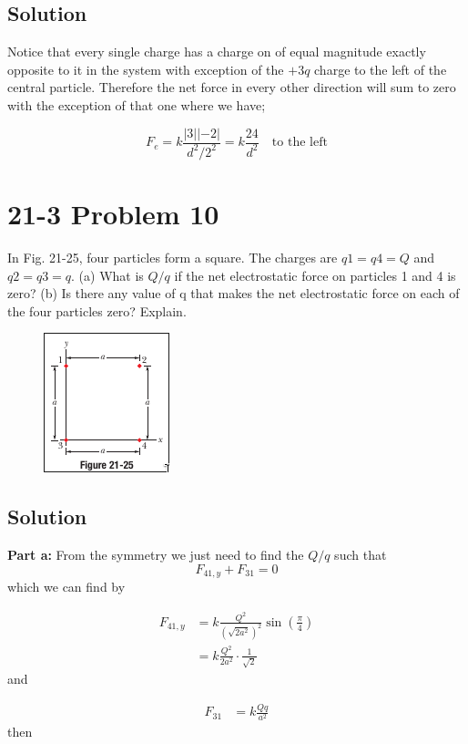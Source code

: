 \documentclass{article}
\begin{document}
\subsection*{Solution}
Notice that every single charge has a charge on of equal magnitude exactly opposite to it in the system with exception of the $+3q$ charge to the left of the central particle.
Therefore the net force in every other direction will sum to zero with the exception of that one where we have;

\[
    F_e = k \frac{|3||-2|}{d^2/2^2} = \boxed{k \frac{24}{d^2} \quad \text{to the left}}
\]

\section*{21-3 Problem 10}
In Fig. 21-25, four particles form a square. The charges are $q1 = q4 = Q$ and $q2 = q3 = q$.
(a) What is $Q/q$ if the net electrostatic force on particles 1 and 4 is zero?
(b) Is there any value of q that makes the net electrostatic force on each of the four particles zero? Explain.

\begin{figure}[ht]
    \centering
    \includegraphics[scale=0.75]{image-4.png}
\end{figure}

\subsection*{Solution}
\textbf{Part a:} From the symmetry we just need to find the $Q/q$ such that
\[
    F_{41,y} + F_{31} = 0
\]
which we can find by

\begin{align*}
    F_{41,y} &= k \frac{Q^2}{\left(\sqrt{2a^2}\right)^2} \sin\left(\frac{\pi}{4}\right)\\
    &= k \frac{Q^2}{2a^2} \cdot \frac{1}{\sqrt{2}}
\end{align*}
and

\begin{align*}
    F_{31} &= k \frac{Qq}{a^2}
\end{align*}
then
\end{document}
